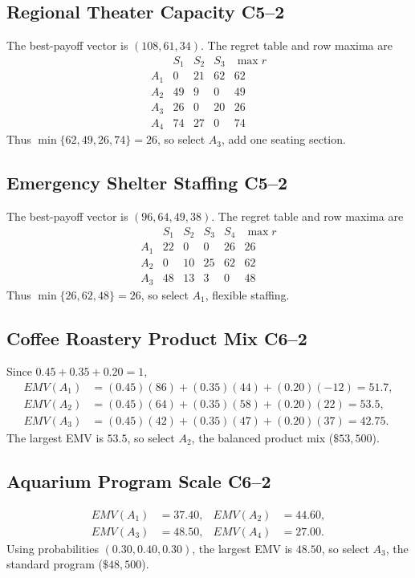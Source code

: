 \subsection{Regional Theater Capacity \hfill C5--2}
The best-payoff vector is $(108,61,34)$. The regret table and row maxima are
\[
\begin{array}{c|ccc|c}&S_1&S_2&S_3&\max r\\ \hline A_1&0&21&62&62\\ A_2&49&9&0&49\\ A_3&26&0&20&26\\ A_4&74&27&0&74\end{array}
\]
Thus $\min\{62,49,26,74\}=26$, so select $\boxed{A_3}$, add one seating section.

\subsection{Emergency Shelter Staffing \hfill C5--2}
The best-payoff vector is $(96,64,49,38)$. The regret table and row maxima are
\[
\begin{array}{c|cccc|c}&S_1&S_2&S_3&S_4&\max r\\ \hline A_1&22&0&0&26&26\\ A_2&0&10&25&62&62\\ A_3&48&13&3&0&48\end{array}
\]
Thus $\min\{26,62,48\}=26$, so select $\boxed{A_1}$, flexible staffing.

\subsection{Coffee Roastery Product Mix \hfill C6--2}
Since $0.45+0.35+0.20=1$,
\begin{align*}
EMV(A_1)&=(0.45)(86)+(0.35)(44)+(0.20)(-12)=51.7,\\
EMV(A_2)&=(0.45)(64)+(0.35)(58)+(0.20)(22)=53.5,\\
EMV(A_3)&=(0.45)(42)+(0.35)(47)+(0.20)(37)=42.75.
\end{align*}
The largest EMV is $53.5$, so select $\boxed{A_2}$, the balanced product mix ($\$53{,}500$).

\subsection{Aquarium Program Scale \hfill C6--2}
\begin{align*}EMV(A_1)&=37.40,&EMV(A_2)&=44.60,\\ EMV(A_3)&=48.50,&EMV(A_4)&=27.00.\end{align*}
Using probabilities $(0.30,0.40,0.30)$, the largest EMV is $48.50$, so select $\boxed{A_3}$, the standard program ($\$48{,}500$).

